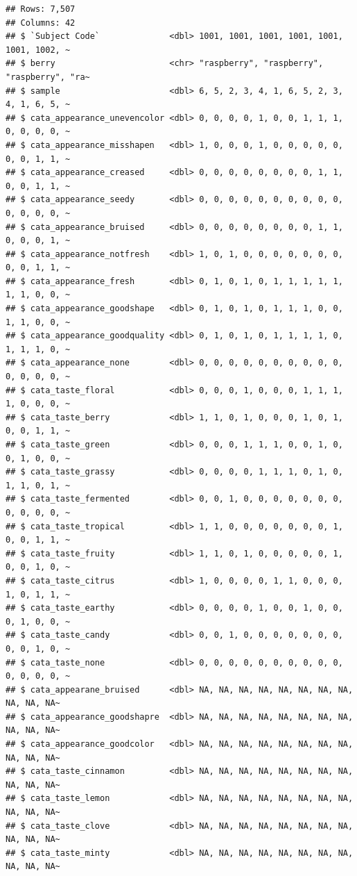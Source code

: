 \documentclass[
]{book}
\begin{document}
\begin{verbatim}
## Rows: 7,507
## Columns: 42
## $ `Subject Code`              <dbl> 1001, 1001, 1001, 1001, 1001, 1001, 1002, ~
## $ berry                       <chr> "raspberry", "raspberry", "raspberry", "ra~
## $ sample                      <dbl> 6, 5, 2, 3, 4, 1, 6, 5, 2, 3, 4, 1, 6, 5, ~
## $ cata_appearance_unevencolor <dbl> 0, 0, 0, 0, 1, 0, 0, 1, 1, 1, 0, 0, 0, 0, ~
## $ cata_appearance_misshapen   <dbl> 1, 0, 0, 0, 1, 0, 0, 0, 0, 0, 0, 0, 1, 1, ~
## $ cata_appearance_creased     <dbl> 0, 0, 0, 0, 0, 0, 0, 0, 1, 1, 0, 0, 1, 1, ~
## $ cata_appearance_seedy       <dbl> 0, 0, 0, 0, 0, 0, 0, 0, 0, 0, 0, 0, 0, 0, ~
## $ cata_appearance_bruised     <dbl> 0, 0, 0, 0, 0, 0, 0, 0, 1, 1, 0, 0, 0, 1, ~
## $ cata_appearance_notfresh    <dbl> 1, 0, 1, 0, 0, 0, 0, 0, 0, 0, 0, 0, 1, 1, ~
## $ cata_appearance_fresh       <dbl> 0, 1, 0, 1, 0, 1, 1, 1, 1, 1, 1, 1, 0, 0, ~
## $ cata_appearance_goodshape   <dbl> 0, 1, 0, 1, 0, 1, 1, 1, 0, 0, 1, 1, 0, 0, ~
## $ cata_appearance_goodquality <dbl> 0, 1, 0, 1, 0, 1, 1, 1, 1, 0, 1, 1, 1, 0, ~
## $ cata_appearance_none        <dbl> 0, 0, 0, 0, 0, 0, 0, 0, 0, 0, 0, 0, 0, 0, ~
## $ cata_taste_floral           <dbl> 0, 0, 0, 1, 0, 0, 0, 1, 1, 1, 1, 0, 0, 0, ~
## $ cata_taste_berry            <dbl> 1, 1, 0, 1, 0, 0, 0, 1, 0, 1, 0, 0, 1, 1, ~
## $ cata_taste_green            <dbl> 0, 0, 0, 1, 1, 1, 0, 0, 1, 0, 0, 1, 0, 0, ~
## $ cata_taste_grassy           <dbl> 0, 0, 0, 0, 1, 1, 1, 0, 1, 0, 1, 1, 0, 1, ~
## $ cata_taste_fermented        <dbl> 0, 0, 1, 0, 0, 0, 0, 0, 0, 0, 0, 0, 0, 0, ~
## $ cata_taste_tropical         <dbl> 1, 1, 0, 0, 0, 0, 0, 0, 0, 1, 0, 0, 1, 1, ~
## $ cata_taste_fruity           <dbl> 1, 1, 0, 1, 0, 0, 0, 0, 0, 1, 0, 0, 1, 0, ~
## $ cata_taste_citrus           <dbl> 1, 0, 0, 0, 0, 1, 1, 0, 0, 0, 1, 0, 1, 1, ~
## $ cata_taste_earthy           <dbl> 0, 0, 0, 0, 1, 0, 0, 1, 0, 0, 0, 1, 0, 0, ~
## $ cata_taste_candy            <dbl> 0, 0, 1, 0, 0, 0, 0, 0, 0, 0, 0, 0, 1, 0, ~
## $ cata_taste_none             <dbl> 0, 0, 0, 0, 0, 0, 0, 0, 0, 0, 0, 0, 0, 0, ~
## $ cata_appearane_bruised      <dbl> NA, NA, NA, NA, NA, NA, NA, NA, NA, NA, NA~
## $ cata_appearance_goodshapre  <dbl> NA, NA, NA, NA, NA, NA, NA, NA, NA, NA, NA~
## $ cata_appearance_goodcolor   <dbl> NA, NA, NA, NA, NA, NA, NA, NA, NA, NA, NA~
## $ cata_taste_cinnamon         <dbl> NA, NA, NA, NA, NA, NA, NA, NA, NA, NA, NA~
## $ cata_taste_lemon            <dbl> NA, NA, NA, NA, NA, NA, NA, NA, NA, NA, NA~
## $ cata_taste_clove            <dbl> NA, NA, NA, NA, NA, NA, NA, NA, NA, NA, NA~
## $ cata_taste_minty            <dbl> NA, NA, NA, NA, NA, NA, NA, NA, NA, NA, NA~

\end{verbatim}
\end{document}
